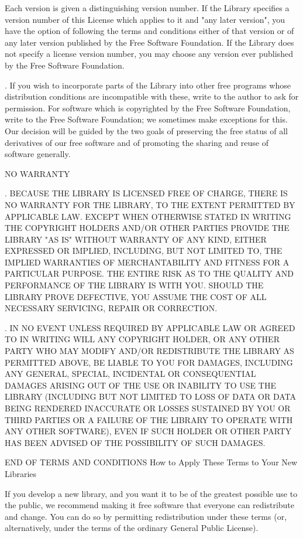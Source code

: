 Each version is given a distinguishing version number. If the Library specifies a version number of this License which applies to it and "any later version", you have the option of following the terms and conditions either of that version or of any later version published by the Free Software Foundation. If the Library does not specify a license version number, you may choose any version ever published by the Free Software Foundation. 

. If you wish to incorporate parts of the Library into other free programs whose distribution conditions are incompatible with these, write to the author to ask for permission. For software which is copyrighted by the Free Software Foundation, write to the Free Software Foundation; we sometimes make exceptions for this. Our decision will be guided by the two goals of preserving the free status of all derivatives of our free software and of promoting the sharing and reuse of software generally. 

\vparasmall
NO WARRANTY

. BECAUSE THE LIBRARY IS LICENSED FREE OF CHARGE, THERE IS NO WARRANTY FOR THE LIBRARY, TO THE EXTENT PERMITTED BY APPLICABLE LAW. EXCEPT WHEN OTHERWISE STATED IN WRITING THE COPYRIGHT HOLDERS AND/OR OTHER PARTIES PROVIDE THE LIBRARY "AS IS" WITHOUT WARRANTY OF ANY KIND, EITHER EXPRESSED OR IMPLIED, INCLUDING, BUT NOT LIMITED TO, THE IMPLIED WARRANTIES OF MERCHANTABILITY AND FITNESS FOR A PARTICULAR PURPOSE. THE ENTIRE RISK AS TO THE QUALITY AND PERFORMANCE OF THE LIBRARY IS WITH YOU. SHOULD THE LIBRARY PROVE DEFECTIVE, YOU ASSUME THE COST OF ALL NECESSARY SERVICING, REPAIR OR CORRECTION. 

. IN NO EVENT UNLESS REQUIRED BY APPLICABLE LAW OR AGREED TO IN WRITING WILL ANY COPYRIGHT HOLDER, OR ANY OTHER PARTY WHO MAY MODIFY AND/OR REDISTRIBUTE THE LIBRARY AS PERMITTED ABOVE, BE LIABLE TO YOU FOR DAMAGES, INCLUDING ANY GENERAL, SPECIAL, INCIDENTAL OR CONSEQUENTIAL DAMAGES ARISING OUT OF THE USE OR INABILITY TO USE THE LIBRARY (INCLUDING BUT NOT LIMITED TO LOSS OF DATA OR DATA BEING RENDERED INACCURATE OR LOSSES SUSTAINED BY YOU OR THIRD PARTIES OR A FAILURE OF THE LIBRARY TO OPERATE WITH ANY OTHER SOFTWARE), EVEN IF SUCH HOLDER OR OTHER PARTY HAS BEEN ADVISED OF THE POSSIBILITY OF SUCH DAMAGES. 

END OF TERMS AND CONDITIONS
\vparasmall
How to Apply These Terms to Your New Libraries

\vparasmall
If you develop a new library, and you want it to be of the greatest possible use to the public, we recommend making it free software that everyone can redistribute and change. You can do so by permitting redistribution under these terms (or, alternatively, under the terms of the ordinary General Public License). 

